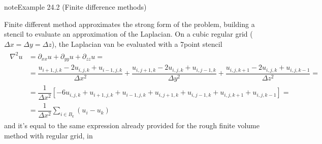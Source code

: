 \documentclass[letterpaper,10pt,english]{jupyterBook}
\begin{document}
\begin{sphinxadmonition}{note}{Example 24.2 (Finite difference methods)}



\sphinxAtStartPar
Finite different method approximates the strong form of the problem, building a stencil to evaluate an approximation of the Laplacian. On a cubic regular grid (\(\Delta x = \Delta y = \Delta z\)), the Laplacian van be evaluated with a 7\sphinxhyphen{}point stencil
\begin{equation*}
\begin{split}\begin{aligned}
  \nabla^2 u
  & = \partial_{xx} u + \partial_{yy} u + \partial_{zz} u = \\
  & = \dfrac{u_{i+1,j,k} - 2 u_{i,j,k} + u_{i-1,j,k}}{\Delta x^2} + \dfrac{u_{i,j+1,k} - 2 u_{i,j,k} + u_{i,j-1,k}}{\Delta y^2} + \dfrac{u_{i,j,k+1} - 2 u_{i,j,k} + u_{i,j,k-1}}{\Delta z^2} =  \\
  & = \dfrac{1}{\Delta x^2} \left[ - 6 u_{i,j,k} + u_{i+1,j,k} + u_{i-1,j,k} + u_{i,j+1,k} + u_{i,j-1,k} + u_{i,j,k+1} + u_{i,j,k-1} \right] = \\
  & = \dfrac{1}{\Delta x^2} \sum_{i \in B_k} (u_i - u_k)
\end{aligned}\end{split}
\end{equation*}
\sphinxAtStartPar
and it’s equal to the same expression already provided for the rough finite volume method with regular grid, in {\hyperref[\detokenize{ch/pde/numerics:pde:ex:fvm}]{}}
\end{sphinxadmonition}
\end{document}
